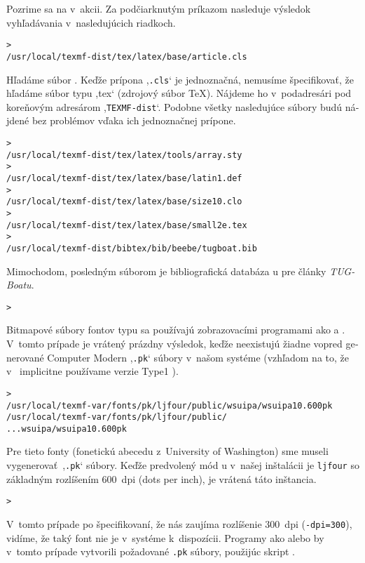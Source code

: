 \documentclass[\classoptions,slovak,english,czech]{\classname}
\newcommand{\singleuv}[1]{,#1`}
\begin{document}
\begin{otherlanguage}{slovak}
Pozrime sa na \KPS{} v~akcii. Za podčiarknutým príkazom nasleduje
výsledok vyhľadávania v~nasledujúcich riadkoch.
\begin{alltt}
> 
/usr/local/texmf-dist/tex/latex/base/article.cls
\end{alltt}
Hľadáme súbor . Keďže prípona \singleuv{\texttt{.cls}} je
jednoznačná, nemusíme špecifikovať, že hľadáme súbor typu \singleuv{tex}
(zdrojový súbor \TeX{}). Nájdeme ho v~podadresári
 pod koreňovým adresárom
\singleuv{\texttt{TEXMF-dist}}. Podobne všetky nasledujúce súbory budú nájdené bez
problémov vďaka ich jednoznačnej prípone.
\begin{alltt}
> 
   /usr/local/texmf-dist/tex/latex/tools/array.sty
> 
   /usr/local/texmf-dist/tex/latex/base/latin1.def
> 
   /usr/local/texmf-dist/tex/latex/base/size10.clo
> 
   /usr/local/texmf-dist/tex/latex/base/small2e.tex
> 
   /usr/local/texmf-dist/bibtex/bib/beebe/tugboat.bib
\end{alltt}

Mimochodom, posledným súborom je bibliografická databáza \BibTeX u pre
články \textsl{TUGBoatu}.

\begin{alltt}
> 
\end{alltt}
Bitmapové súbory fontov typu  sa používajú zobrazovacími
programami ako  a . V~tomto prípade
je vrátený prázdny výsledok, keďže neexistujú žiadne vopred
generované Computer Modern \singleuv{\texttt{.pk}} súbory v~našom systéme
(vzhľadom na to, že v~\TL{} implicitne používame verzie Type1 ).
\begin{alltt}
> 
\ifSingleColumn   /usr/local/texmf-var/fonts/pk/ljfour/public/wsuipa/wsuipa10.600pk
\else /usr/local/texmf-var/fonts/pk/ljfour/public/
...                         wsuipa/wsuipa10.600pk
\fi\end{alltt}
Pre tieto fonty (fonetickú abecedu z~University of Washington) sme museli vygenerovať\
\singleuv{\texttt{.pk}} súbory. Keďže predvolený mód \MF u v~našej inštalácii
je \texttt{ljfour} so základným rozlíšením 600~dpi (dots per inch),
je vrátená táto inštancia.
\begin{alltt}
> 
\end{alltt}
V~tomto prípade po špecifikovaní, že nás zaujíma rozlíšenie 300~dpi
(\texttt{-dpi=300}), vidíme, že taký font nie je v~systéme
k~dispozícii. Programy ako  alebo 
by v~tomto prípade vytvorili požadované \texttt{.pk} súbory, použijúc skript .


\end{otherlanguage}
\end{document}
